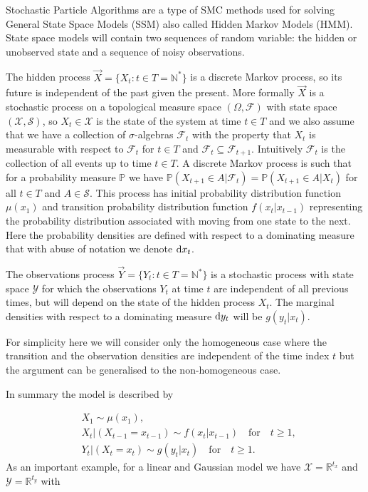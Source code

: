 Stochastic Particle Algorithms are a type of SMC methods used for solving General State Space Models (SSM) also called Hidden Markov Models (HMM). State space models will contain two sequences of random variable: the hidden or unobserved state and a sequence of noisy observations. 

The hidden process $\vec{X} = \{X_t : t \in T = \mathbb{N}^* \}$ is a discrete Markov process, so its future is independent of the past given the present. More formally $\vec{X}$ is a stochastic process on a topological measure space $(\Omega, \mathcal{F})$ with state space $(\mathcal{X}, \mathcal{S})$, so $X_t \in \mathcal{X}$ is the state of the system at time $t \in T$ and we also assume that we have a collection of $\sigma$-algebras $\mathcal{F}_t$ with the property that $X_t$ is measurable with respect to $\mathcal{F}_t$ for $t \in T$ and $\mathcal{F}_t \subseteq \mathcal{F}_{t+1}$. Intuitively $\mathcal{F}_t$ is the collection of all events up to time $t \in T$. A discrete Markov process is such that for a probability measure $\mathbb{P}$ we have $\mathbb{P}(X_{t+1} \in A | \mathcal{F}_t) = \mathbb{P}(X_{t+1} \in A | X_t)$ for all $t \in T$ and $A \in \mathcal{S}$. This process has initial probability distribution function $\mu(x_1)$ and transition probability distribution function $f(x_t | x_{t-1})$ representing the probability distribution associated with moving from one state to the next. Here the probability densities are defined with respect to a dominating measure that with abuse of notation we denote $\operatorname{d}\!{x}_t$. 

The observations process $\vec{Y} = \{Y_t : t \in T = \mathbb{N}^* \}$ is a stochastic process with state space $\mathcal{Y}$ for which the observations $Y_t$ at time $t$ are independent of all previous times, but will depend on the state of the hidden process $X_t$. The marginal densities with respect to a dominating measure $\operatorname{d}\!{y}_t$ will be $g(y_t | x_t)$.

For simplicity here we will consider only the homogeneous case where the transition and the observation densities are independent of the time index $t$ but the argument can be generalised to the non-homogeneous case. 

In summary the model is described by

\begin{align}
    & X_1 \sim \mu(x_1), \label{eq:1X_1}\\
    & X_t | (X_{t-1} = x_{t-1}) \sim f(x_t | x_{t-1}) \quad \text{for} \quad t\geq 1, \label{eq:1X_t} \\ 
    & Y_t | (X_t = x_t) \sim g(y_t | x_t) \quad \text{for} \quad t\geq 1. \label{eq:1Y_t}
\end{align}
As an important example, for a linear and Gaussian model we have $\mathcal{X} = \mathbb{R}^{t_x}$ and $\mathcal{Y} = \mathbb{R}^{t_y}$ with


